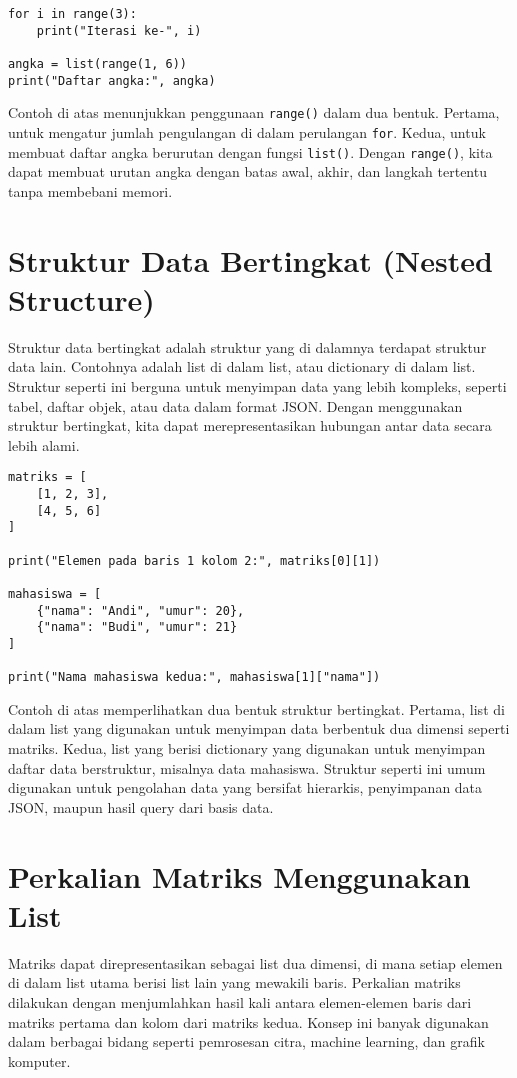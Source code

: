 \begin{lstlisting}[style=PythonStyle]
for i in range(3):
    print("Iterasi ke-", i)

angka = list(range(1, 6))
print("Daftar angka:", angka)
\end{lstlisting}

Contoh di atas menunjukkan penggunaan \texttt{range()} dalam dua bentuk. 
Pertama, untuk mengatur jumlah pengulangan di dalam perulangan \texttt{for}. 
Kedua, untuk membuat daftar angka berurutan dengan fungsi \texttt{list()}. 
Dengan \texttt{range()}, kita dapat membuat urutan angka dengan batas awal, akhir, dan langkah tertentu tanpa membebani memori.


\section{Struktur Data Bertingkat (Nested Structure)}
Struktur data bertingkat adalah struktur yang di dalamnya terdapat struktur data lain. 
Contohnya adalah list di dalam list, atau dictionary di dalam list. 
Struktur seperti ini berguna untuk menyimpan data yang lebih kompleks, seperti tabel, daftar objek, atau data dalam format JSON. 
Dengan menggunakan struktur bertingkat, kita dapat merepresentasikan hubungan antar data secara lebih alami.

\begin{lstlisting}[style=PythonStyle]
matriks = [
    [1, 2, 3],
    [4, 5, 6]
]

print("Elemen pada baris 1 kolom 2:", matriks[0][1])

mahasiswa = [
    {"nama": "Andi", "umur": 20},
    {"nama": "Budi", "umur": 21}
]

print("Nama mahasiswa kedua:", mahasiswa[1]["nama"])
\end{lstlisting}

Contoh di atas memperlihatkan dua bentuk struktur bertingkat. 
Pertama, list di dalam list yang digunakan untuk menyimpan data berbentuk dua dimensi seperti matriks. 
Kedua, list yang berisi dictionary yang digunakan untuk menyimpan daftar data berstruktur, misalnya data mahasiswa. 
Struktur seperti ini umum digunakan untuk pengolahan data yang bersifat hierarkis, penyimpanan data JSON, maupun hasil query dari basis data.

\section{Perkalian Matriks Menggunakan List}
Matriks dapat direpresentasikan sebagai list dua dimensi, di mana setiap elemen di dalam list utama berisi list lain yang mewakili baris. 
Perkalian matriks dilakukan dengan menjumlahkan hasil kali antara elemen-elemen baris dari matriks pertama dan kolom dari matriks kedua. 
Konsep ini banyak digunakan dalam berbagai bidang seperti pemrosesan citra, machine learning, dan grafik komputer.

